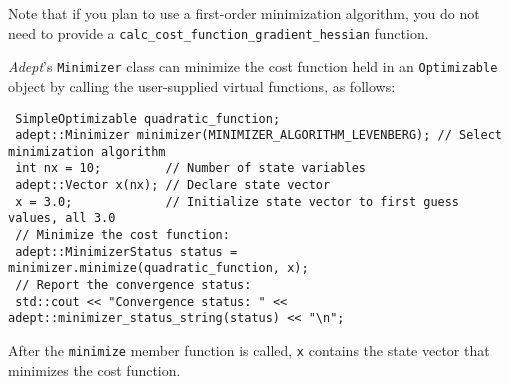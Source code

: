 \documentclass[a4,oneside]{book}
\def\codesize{\small}
\def\Adept{\emph{Adept}}
\def\code#1{{\codesize\texttt{#1}}}
\begin{document}
Note that if you plan to use a first-order minimization algorithm, you
do not need to provide a
\code{calc\_cost\_function\_gradient\_hessian} function.

\Adept's \code{Minimizer} class can minimize the cost function
held in an \code{Optimizable} object by calling the user-supplied
virtual functions, as follows:
\begin{lstlisting}
 SimpleOptimizable quadratic_function;
 adept::Minimizer minimizer(MINIMIZER_ALGORITHM_LEVENBERG); // Select minimization algorithm
 int nx = 10;         // Number of state variables
 adept::Vector x(nx); // Declare state vector
 x = 3.0;             // Initialize state vector to first guess values, all 3.0
 // Minimize the cost function:
 adept::MinimizerStatus status = minimizer.minimize(quadratic_function, x);
 // Report the convergence status:
 std::cout << "Convergence status: " << adept::minimizer_status_string(status) << "\n";
\end{lstlisting}
%
After the \code{minimize} member function is called, \code{x} contains
the state vector that minimizes the cost function.
\end{document}
